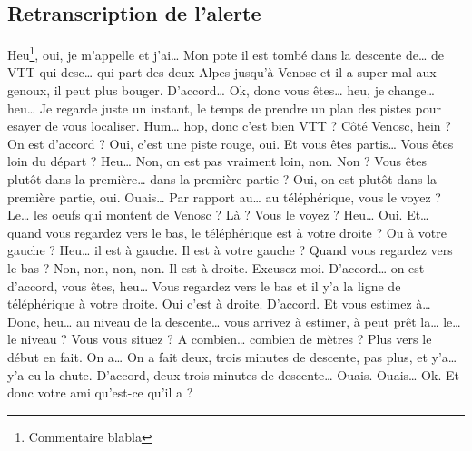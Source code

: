 \subsection{Retranscription de l'alerte}
\begin{dialogue}
\Req {} Heu\footnote{Commentaire blabla}, oui, je m'appelle  et j'ai… Mon pote il est tombé dans
la descente de… de VTT qui desc… qui part des deux Alpes jusqu'à Venosc et il a super mal aux genoux, il peut plus bouger.
\Sec D'accord… Ok, donc vous êtes… heu, je change… heu… Je regarde juste un instant, le temps de prendre un plan des pistes pour esayer de vous localiser. Hum… hop, donc c'est bien VTT ? Côté Venosc, hein ? On est d’accord ?
\Req Oui, c'est une piste rouge, oui.
\Sec Et vous êtes partis… Vous êtes loin du départ ?
\Req Heu… Non, on est pas vraiment loin, non.
\Sec Non ? Vous êtes plutôt dans la première… dans la première partie ?
\Req Oui, on est plutôt dans la première partie, oui.
\Sec Ouais… Par rapport au… au téléphérique, vous le voyez ? Le… les oeufs qui montent de Venosc ? Là ? Vous le voyez ?
\Req Heu… Oui.
\Sec Et… quand vous regardez vers le bas, le téléphérique est à votre droite ? Ou à votre gauche ?
\Req Heu… il est à gauche.
\Sec Il est à votre gauche   ? Quand vous regardez vers le bas ?
\Req Non, non, non, non. Il est à droite. Excusez-moi.
\Sec D'accord… on est d'accord, vous êtes, heu… Vous regardez vers le bas et il y'a la ligne de téléphérique à votre droite.
\Req Oui c'est à droite.
\Sec D'accord. Et vous estimez à… Donc, heu… au niveau de la descente… vous arrivez à estimer, à peut prêt la… le… le niveau ? Vous vous situez ? A combien… combien de mètres ?
\Req Plus vers le début en fait. On a… On a fait deux, trois minutes de descente, pas plus, et y'a… y'a eu la chute.
\Sec D'accord, deux-trois minutes de descente…
\Req Ouais.
\Sec Ouais… Ok. Et donc votre ami qu'est-ce qu'il a ? 
\end{dialogue}
